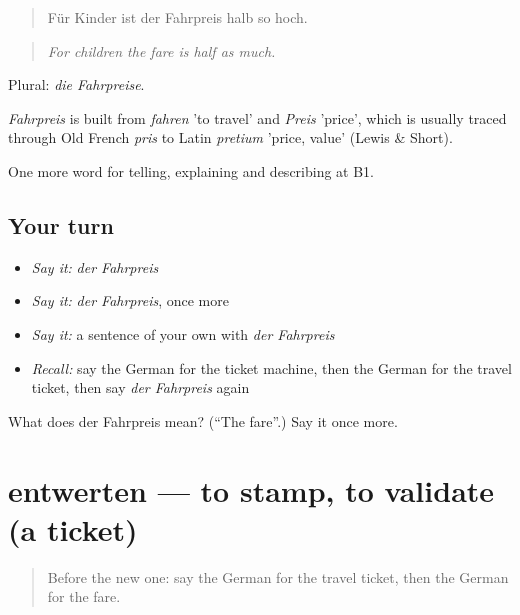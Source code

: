 \begin{quote}
Für Kinder ist der Fahrpreis halb so hoch.
\end{quote}

\begin{quote}
\emph{For children the fare is half as much.}
\end{quote}

Plural: \emph{die Fahrpreise}.

\begin{cousinweb}
\emph{Fahrpreis} is built from \emph{fahren} 'to travel' and \emph{Preis} 'price', which is usually traced through Old French \emph{pris} to Latin \emph{pretium} 'price, value' (Lewis \& Short).
\end{cousinweb}

\begin{grammarlens}[title={What you've built}]
One more word for telling, explaining and describing at B1.
\end{grammarlens}

\subsection*{Your turn}
\begin{itemize}
\raggedright
  \item \emph{Say it:} \emph{der Fahrpreis}
  \item \emph{Say it:} \emph{der Fahrpreis}, once more
  \item \emph{Say it:} a sentence of your own with \emph{der Fahrpreis}
  \item \emph{Recall:} say the German for the ticket machine, then the German for the travel ticket, then say \emph{der Fahrpreis} again
\end{itemize}

\begin{tcolorbox}[breakable,colback=teal!4,colframe=teal!35!black,title={Before you move on}]
What does der Fahrpreis mean? (\textquotedblleft{}The fare\textquotedblright{}.) Say it once more.
\end{tcolorbox}
\section[entwerten]{entwerten — to stamp, to validate (a ticket)}

\label{lesson:GE-C411-entwerten}



\begin{quote}
Before the new one: say the German for the travel ticket, then the German for the fare.
\end{quote}

